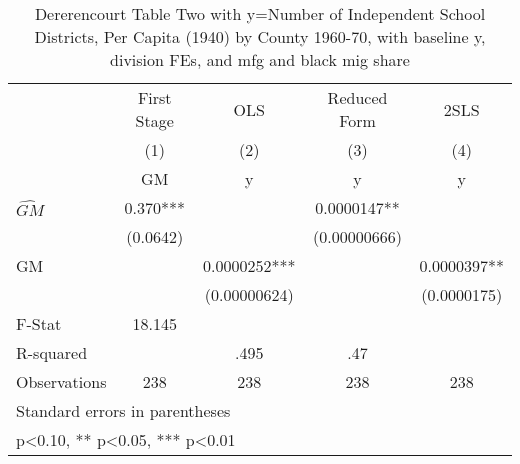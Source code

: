 \begin{table}[htbp]\centering
\def\sym#1{\ifmmode^{#1}\else\(^{#1}\)\fi}
\caption{Dererencourt Table Two with y=Number of Independent School Districts, Per Capita (1940) by County 1960-70, with baseline y, division FEs, and mfg and black mig share}
\begin{tabular}{l*{4}{c}}
\toprule
                    & First Stage   &         OLS   &Reduced Form   &        2SLS   \\
                    &\multicolumn{1}{c}{(1)}&\multicolumn{1}{c}{(2)}&\multicolumn{1}{c}{(3)}&\multicolumn{1}{c}{(4)}\\
                    &\multicolumn{1}{c}{GM}&\multicolumn{1}{c}{y}&\multicolumn{1}{c}{y}&\multicolumn{1}{c}{y}\\
\midrule
$\hat{GM}$          &       0.370***&               &   0.0000147** &               \\
                    &    (0.0642)   &               &(0.00000666)   &               \\
\addlinespace
GM                  &               &   0.0000252***&               &   0.0000397** \\
                    &               &(0.00000624)   &               & (0.0000175)   \\
\midrule
F-Stat              &      18.145   &               &               &               \\
R-squared           &               &        .495   &         .47   &               \\
Observations        &         238   &         238   &         238   &         238   \\
\bottomrule
\multicolumn{5}{l}{\footnotesize Standard errors in parentheses}\\
\multicolumn{5}{l}{\footnotesize * p<0.10, ** p<0.05, *** p<0.01}\\
\end{tabular}
\end{table}
